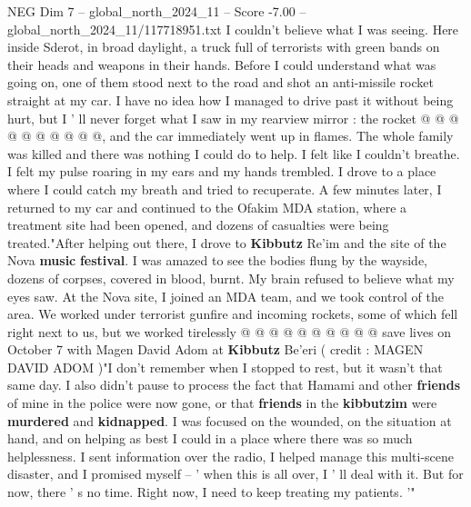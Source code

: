 \begin{textsample}{NEG Dim 7 – global\_north\_2024\_11 – Score -7.00 – global\_north\_2024\_11/117718951.txt}
I couldn't believe what I was seeing.
Here inside Sderot, in broad daylight, a truck full of terrorists with green bands on their heads and weapons in their hands.
Before I could understand what was going on, one of them stood next to the road and shot an anti-missile rocket straight at my car.
I have no idea how I managed to drive past it without being hurt, but I ' ll never forget what I saw in my rearview mirror : the rocket @ @ @ @ @ @ @ @ @ @, and the car immediately went up in flames.
The whole family was killed and there was nothing I could do to help.
I felt like I couldn't breathe.
I felt my pulse roaring in my ears and my hands trembled.
I drove to a place where I could catch my breath and tried to recuperate.
A few minutes later, I returned to my car and continued to the Ofakim MDA station, where a treatment site had been opened, and dozens of casualties were being treated."After helping out there, I drove to \textbf{Kibbutz} Re'im and the site of the Nova \textbf{music} \textbf{festival}.
I was amazed to see the bodies flung by the wayside, dozens of corpses, covered in blood, burnt.
My brain refused to believe what my eyes saw.
At the Nova site, I joined an MDA team, and we took control of the area.
We worked under terrorist gunfire and incoming rockets, some of which fell right next to us, but we worked tirelessly @ @ @ @ @ @ @ @ @ @ save lives on October 7 with Magen David Adom at \textbf{Kibbutz} Be'eri ( credit : MAGEN DAVID ADOM )"I don't remember when I stopped to rest, but it wasn't that same day.
I also didn't pause to process the fact that Hamami and other \textbf{friends} of mine in the police were now gone, or that \textbf{friends} in the \textbf{kibbutzim} were \textbf{murdered} and \textbf{kidnapped}.
I was focused on the wounded, on the situation at hand, and on helping as best I could in a place where there was so much helplessness.
I sent information over the radio, I helped manage this multi-scene disaster, and I promised myself -- ' when this is all over, I ' ll deal with it.
But for now, there ' s no time.
Right now, I need to keep treating my patients. '"

\end{textsample}
